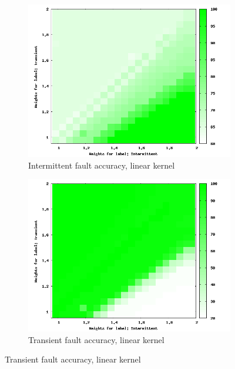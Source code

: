 \begin{figure}
        \centering
			\captionsetup{justification=centering}
        \begin{subfigure}[h]{0.45\linewidth}
                \includegraphics[scale=0.25]{figures/lin256i.png}
                \caption{Intermittent fault accuracy, linear kernel}
        \end{subfigure}
        \begin{subfigure}[h]{0.45\linewidth}
                \includegraphics[scale=0.25]{figures/lin256t.png}
                \caption{Transient fault accuracy, linear kernel}
        \end{subfigure}


\end{figure}
